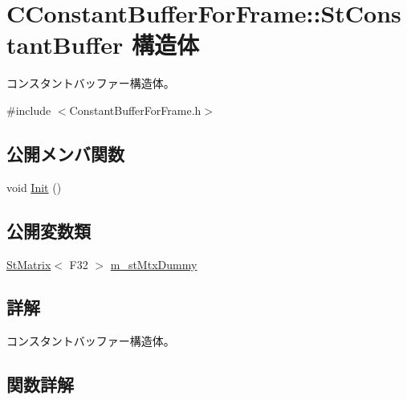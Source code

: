 \hypertarget{struct_c_constant_buffer_for_frame_1_1_st_constant_buffer}{}\section{C\+Constant\+Buffer\+For\+Frame\+:\+:St\+Constant\+Buffer 構造体}
\label{struct_c_constant_buffer_for_frame_1_1_st_constant_buffer}


コンスタントバッファー構造体。  




{\ttfamily \#include $<$Constant\+Buffer\+For\+Frame.\+h$>$}

\subsection*{公開メンバ関数}
\begin{DoxyCompactItemize}
\item 
void \hyperlink{struct_c_constant_buffer_for_frame_1_1_st_constant_buffer_ae6e4b92d683451ddad8f469ff30f8a53}{Init} ()
\end{DoxyCompactItemize}
\subsection*{公開変数類}
\begin{DoxyCompactItemize}
\item 
\hyperlink{struct_st_matrix}{St\+Matrix}$<$ F32 $>$ \hyperlink{struct_c_constant_buffer_for_frame_1_1_st_constant_buffer_a33e830ed8a746b3732304627f5e133d5}{m\+\_\+st\+Mtx\+Dummy}
\end{DoxyCompactItemize}


\subsection{詳解}
コンスタントバッファー構造体。 

\subsection{関数詳解}
\hypertarget{struct_c_constant_buffer_for_frame_1_1_st_constant_buffer_ae6e4b92d683451ddad8f469ff30f8a53}{}
